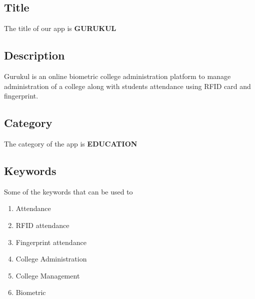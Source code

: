 \subsection{Title}
\hspace{.8cm}The title of our app is \textbf{GURUKUL}

\subsection{Description}
\hspace{.8cm}Gurukul is an online biometric college administration platform to manage administration of a college along with students attendance using RFID card and fingerprint.

\subsection{Category}
\hspace{.8 cm} The category of the app is \textbf{EDUCATION}

\subsection{Keywords}
\hspace{.8cm} Some of the keywords that can be used to 
\begin{enumerate}
    \item Attendance
    \item RFID attendance
    \item Fingerprint attendance
    \item College Administration
    \item College Management
    \item Biometric
\end{enumerate}